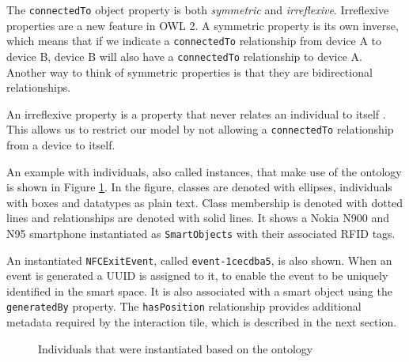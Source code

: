 The \texttt{connectedTo} object property is both \emph{symmetric} and \emph{irreflexive}. Irreflexive properties are a new feature in \ac{OWL} 2. A symmetric property is its own inverse, which means that if we indicate a \texttt{connectedTo} relationship from device A to device B, device B will also have a \texttt{connectedTo} relationship to device A. Another way to think of symmetric properties is that they are bidirectional relationships. 

An irreflexive property is a property that never relates an individual to itself \cite{Hebeler2009}. This allows us to restrict our model by not allowing a \texttt{connectedTo} relationship from a device to itself.


An example with individuals, also called instances, that make use of the ontology is shown in Figure \ref{ontologyInstance}. In the figure, classes are denoted with ellipses, individuals with boxes and datatypes as plain text. Class membership is denoted with dotted lines and relationships are denoted with solid lines. It shows a Nokia N900 and N95 smartphone instantiated as \texttt{SmartObjects} with their associated \ac{RFID} tags.

An instantiated \texttt{NFCExitEvent}, called \texttt{event-1cecdba5}, is also shown. When an event is generated a \ac{UUID} is assigned to it, to enable the event to be uniquely identified in the smart space. It is also associated with a smart object using the \texttt{generatedBy} property. The \texttt{hasPosition} relationship provides additional metadata required by the interaction tile, which is described in the next section.  

\begin{figure}[bth]
	\caption{Individuals that were instantiated based on the ontology}
	\label{ontologyInstance}
\end{figure}


